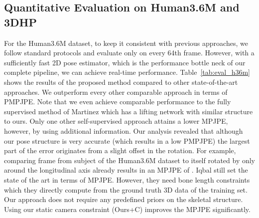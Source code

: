 \documentclass[final]{cvpr}
\begin{document}
\subsection{Quantitative Evaluation on Human3.6M and 3DHP}
For the Human3.6M dataset, to keep it consistent with previous approaches, we follow standard protocols and evaluate only on every 64th frame.
However, with a sufficiently fast 2D pose estimator, which is the performance bottle neck of our complete pipeline, we can achieve real-time performance.
Table~\ref{tab:eval_h36m} shows the results of the proposed method compared to other state-of-the-art approaches.
We outperform every other comparable approach in terms of PMPJPE.
Note that we even achieve comparable performance to the fully supervised method of Martinez \etal \cite{martinez_2017_3Dbaseline} which has a lifting network with similar structure to ours.
Only one other self-supervised approach attains a lower MPJPE, however, by using additional information.
Our analysis revealed that although our pose structure is very accurate (which results in a low PMPJPE) the largest part of the error originates from a slight offset in the rotation.
For example, comparing frame  from subject  of the Human3.6M dataset to itself rotated by only  around the longitudinal axis already results in an MPJPE of .
Iqbal \etal \cite{Iqbal_2020_CVPR} still set the state of the art in terms of MPJPE.
However, they need bone length constraints which they directly compute from the ground truth 3D data of the training set.
Our approach does not require any predefined priors on the skeletal structure.
Using our static camera constraint (Ours+C) improves the MPJPE significantly.
\end{document}
